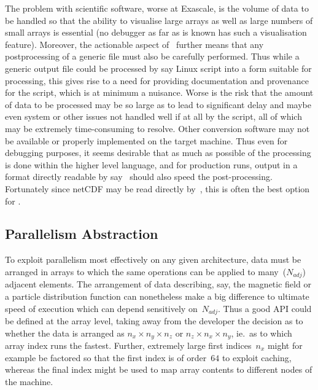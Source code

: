 The problem with scientific software, worse
at Exascale, is the volume of data to be handled so that the ability to visualise large arrays
as well as large numbers of small arrays is essential (no debugger as far as is known has 
such a visualisation feature).  Moreover, the actionable aspect of \nep\ further means
that any postprocessing of a generic file must also be carefully performed. Thus while
a generic output file could be processed by say Linux  script into a form suitable for
 processing, this gives rise to a need for providing documentation and
provenance for the script, which is at minimum a nuisance. Worse is the risk that the amount of
data to be processed may be so large as to lead to significant
delay and maybe even system or other issues not handled well if at all by the script, all of which
may be extremely time-consuming to resolve. Other conversion software may not be available
or properly implemented on the target machine.
Thus even for debugging purposes, it seems desirable that as much as possible of the processing
is done within the higher level language, and for production runs, output in a format
directly readable by say~ should also speed the post-processing. Fortunately
since netCDF may be read directly by~, this is often the best option for .


\subsection{Parallelism Abstraction}\label{sec:parabstr}
To exploit parallelism most effectively on any given architecture,
data must be arranged in arrays to which the same operations
can be applied to many~($N_{adj}$)  adjacent elements. The arrangement of data describing, say, the
magnetic field or a particle distribution function can nonetheless make a big difference
to ultimate speed of execution which can depend sensitively on~$N_{adj}$.
Thus a good API could be defined  at the array level, taking away from the developer
the decision as to whether the data is arranged as $n_x \times n_y \times n_z$
or $n_z \times n_x \times n_y$, ie.\ as to which array index runs the fastest. 
Further, extremely large first indices~$n_x$
might for example be factored so that the first index is of order~$64$ to exploit caching,
whereas the final index might be used to map array contents to different nodes of the machine.

